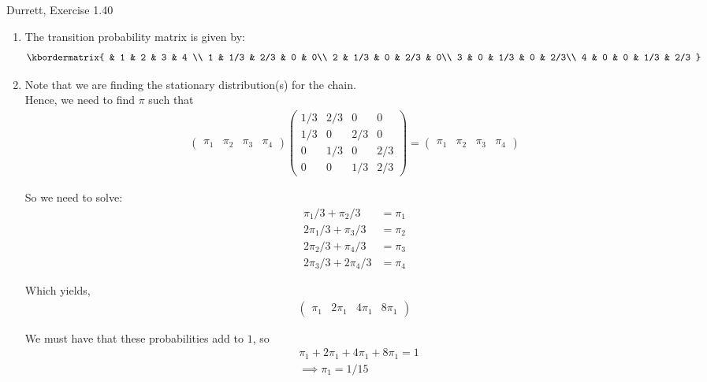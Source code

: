 \documentclass[12pt]{article}
\newenvironment{problem}[2][Problem]{\begin{trivlist}
\item[\hskip \labelsep {\bfseries #1}\hskip \labelsep {\bfseries #2.}]}{\end{trivlist}}
\begin{document}
\newpage
\begin{problem}{2}
Durrett, Exercise 1.40
\end{problem}

\begin{enumerate}[label=(\alph*)]
\item The transition probability matrix is given by:
\begin{align*}
\kbordermatrix{
    & 1 & 2 & 3 & 4 \\
    1 & 1/3 & 2/3 & 0 & 0\\
    2 & 1/3 & 0 & 2/3 & 0\\
    3 & 0 & 1/3 & 0 & 2/3\\
    4 & 0 & 0 & 1/3 & 2/3
  }
\end{align*}

\item Note that we are finding the stationary distribution(s) for the chain.\\

Hence, we need to find $\pi$ such that
\begin{align*}
\begin{pmatrix}
\pi_1 & \pi_2 & \pi_3 & \pi_4
\end{pmatrix} \begin{pmatrix}
    1/3 & 2/3 & 0 & 0\\
    1/3 & 0 & 2/3 & 0\\
    0 & 1/3 & 0 & 2/3\\
    0 & 0 & 1/3 & 2/3
\end{pmatrix}
  = \begin{pmatrix}
\pi_1 & \pi_2 & \pi_3 & \pi_4
\end{pmatrix} 
\end{align*}

So we need to solve:
\begin{align*}
\pi_1/3 + \pi_2/3 &= \pi_1\\
2\pi_1/3 + \pi_3/3 &= \pi_2\\
2\pi_2/3 + \pi_4/3 &= \pi_3\\
2\pi_3/3 + 2\pi_4/3 &= \pi_4
\end{align*}

Which yields,
\begin{align*}
\begin{pmatrix}
\pi_1 & 2\pi_1 & 4\pi_1 & 8\pi_1
\end{pmatrix} 
\end{align*}

We must have that these probabilities add to $1$, so 
\begin{align*}
&\pi_1 + 2\pi_1 + 4\pi_1 + 8\pi_1 = 1\\
&\implies \pi_1 = 1/15
\end{align*}


\end{enumerate}
\end{document}
